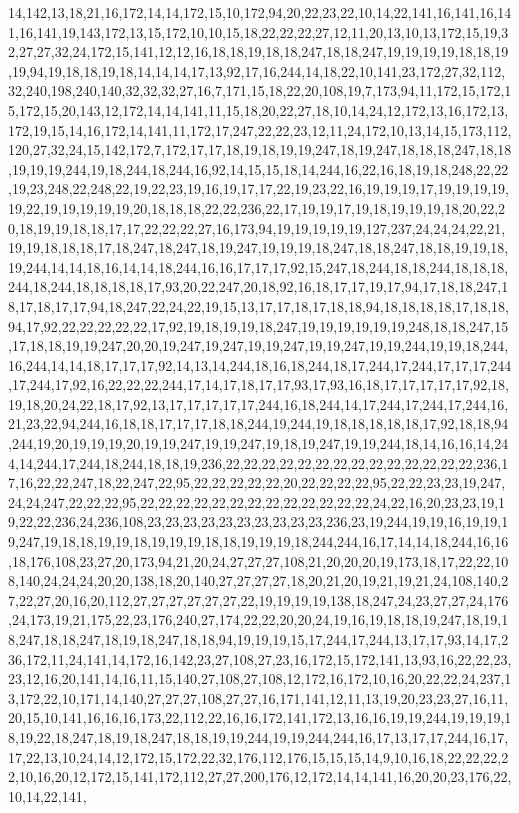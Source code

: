 14,142,13,18,21,16,172,14,14,172,15,10,172,94,20,22,23,22,10,14,22,141,16,141,16,141,16,141,19,143,172,13,15,172,10,10,15,18,22,22,22,27,12,11,20,13,10,13,172,15,19,32,27,27,32,24,172,15,141,12,12,16,18,18,19,18,18,247,18,18,247,19,19,19,19,18,18,19,19,94,19,18,18,19,18,14,14,14,17,13,92,17,16,244,14,18,22,10,141,23,172,27,32,112,32,240,198,240,140,32,32,32,27,16,7,171,15,18,22,20,108,19,7,173,94,11,172,15,172,15,172,15,20,143,12,172,14,14,141,11,15,18,20,22,27,18,10,14,24,12,172,13,16,172,13,172,19,15,14,16,172,14,141,11,172,17,247,22,22,23,12,11,24,172,10,13,14,15,173,112,120,27,32,24,15,142,172,7,172,17,17,18,19,18,19,19,247,18,19,247,18,18,18,247,18,18,19,19,19,244,19,18,244,18,244,16,92,14,15,15,18,14,244,16,22,16,18,19,18,248,22,22,19,23,248,22,248,22,19,22,23,19,16,19,17,17,22,19,23,22,16,19,19,19,17,19,19,19,19,19,22,19,19,19,19,19,20,18,18,18,22,22,236,22,17,19,19,17,19,18,19,19,19,18,20,22,20,18,19,19,18,18,17,17,22,22,22,27,16,173,94,19,19,19,19,19,127,237,24,24,24,22,21,19,19,18,18,18,17,18,247,18,247,18,19,247,19,19,19,18,247,18,18,247,18,18,19,19,18,19,244,14,14,18,16,14,14,18,244,16,16,17,17,17,92,15,247,18,244,18,18,244,18,18,18,244,18,244,18,18,18,18,17,93,20,22,247,20,18,92,16,18,17,17,19,17,94,17,18,18,247,18,17,18,17,17,94,18,247,22,24,22,19,15,13,17,17,18,17,18,18,94,18,18,18,18,17,18,18,94,17,92,22,22,22,22,22,17,92,19,18,19,19,18,247,19,19,19,19,19,19,248,18,18,247,15,17,18,18,19,19,247,20,20,19,247,19,247,19,19,247,19,19,247,19,19,244,19,19,18,244,16,244,14,14,18,17,17,17,92,14,13,14,244,18,16,18,244,18,17,244,17,244,17,17,17,244,17,244,17,92,16,22,22,22,244,17,14,17,18,17,17,93,17,93,16,18,17,17,17,17,17,92,18,19,18,20,24,22,18,17,92,13,17,17,17,17,17,244,16,18,244,14,17,244,17,244,17,244,16,21,23,22,94,244,16,18,18,17,17,17,18,18,244,19,244,19,18,18,18,18,18,17,92,18,18,94,244,19,20,19,19,19,20,19,19,247,19,19,247,19,18,19,247,19,19,244,18,14,16,16,14,244,14,244,17,244,18,244,18,18,19,236,22,22,22,22,22,22,22,22,22,22,22,22,22,22,236,17,16,22,22,247,18,22,247,22,95,22,22,22,22,22,20,22,22,22,22,95,22,22,23,23,19,247,24,24,247,22,22,22,95,22,22,22,22,22,22,22,22,22,22,22,22,22,24,22,16,20,23,23,19,19,22,22,236,24,236,108,23,23,23,23,23,23,23,23,23,23,236,23,19,244,19,19,16,19,19,19,247,19,18,18,19,19,18,19,19,19,18,18,19,19,19,18,244,244,16,17,14,14,18,244,16,16,18,176,108,23,27,20,173,94,21,20,24,27,27,27,108,21,20,20,20,19,173,18,17,22,22,108,140,24,24,24,20,20,138,18,20,140,27,27,27,27,18,20,21,20,19,21,19,21,24,108,140,27,22,27,20,16,20,112,27,27,27,27,27,27,22,19,19,19,19,138,18,247,24,23,27,27,24,176,24,173,19,21,175,22,23,176,240,27,174,22,22,20,20,24,19,16,19,18,18,19,247,18,19,18,247,18,18,247,18,19,18,247,18,18,94,19,19,19,15,17,244,17,244,13,17,17,93,14,17,236,172,11,24,141,14,172,16,142,23,27,108,27,23,16,172,15,172,141,13,93,16,22,22,23,23,12,16,20,141,14,16,11,15,140,27,108,27,108,12,172,16,172,10,16,20,22,22,24,237,13,172,22,10,171,14,140,27,27,27,108,27,27,16,171,141,12,11,13,19,20,23,23,27,16,11,20,15,10,141,16,16,16,173,22,112,22,16,16,172,141,172,13,16,16,19,19,244,19,19,19,18,19,22,18,247,18,19,18,247,18,18,19,19,244,19,19,244,244,16,17,13,17,17,244,16,17,17,22,13,10,24,14,12,172,15,172,22,32,176,112,176,15,15,15,14,9,10,16,18,22,22,22,22,10,16,20,12,172,15,141,172,112,27,27,200,176,12,172,14,14,141,16,20,20,23,176,22,10,14,22,141,